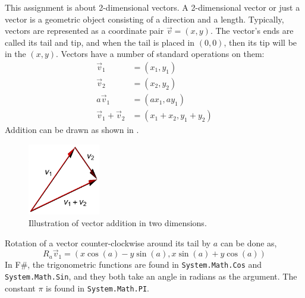 This assignment is about 2-dimensional vectors. A 2-dimensional vector or just a vector is a geometric object consisting of a direction and a length. Typically, vectors are represented as a coordinate pair $\vec v  = (x, y)$. The vector's ends are called its tail and tip, and when the tail is placed in $(0, 0)$, then its tip will be in the  $(x, y)$. Vectors have a number of standard operations on them:
\begin{align}
  \vec v_1 &= (x_1, y_1)
  \\\vec v_2 &= (x_2, y_2)
  \\a \vec v_1 &= (a x_1, a y_1)
  \\\vec v_1 + \vec v_2 &= (x_1+x_2, y_1+y_2)
\end{align}
Addition can be drawn as shown in .
\begin{figure}
  \centering
  \includegraphics[width=0.28\textwidth]{vectorAddition}
  \caption{Illustration of vector addition in two dimensions.}
  \label{fig:vectorAddition}
\end{figure}
Rotation of a vector counter-clockwise around its tail by $a$ can be done as,
\begin{equation}
  R_a \vec v_1 = (x\cos(a) - y\sin(a),x\sin(a)+y\cos(a))
\end{equation}
In F\#, the trigonometric functions are found in \lstinline{System.Math.Cos} and \lstinline{System.Math.Sin}, and they both take an angle in radians as the argument. The constant $\pi$ is found in \lstinline{System.Math.PI}.

